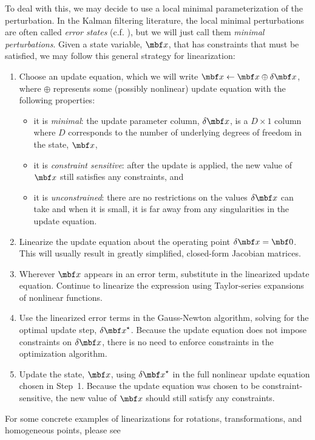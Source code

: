 \documentclass[11pt,a4,oneside]{article}
\begin{document}
To deal with this, we may decide to use a local minimal parameterization of the perturbation. In the Kalman filtering literature, the local minimal perturbations are often called {\em error states} (c.f. \citet{Mirzaei0800}), but we will just call them {\em minimal perturbations}. Given a state variable, $\mbf x$, that has constraints that must be satisfied, we may follow this general strategy for linearization:
\begin{enumerate}
  \item Choose an update equation, which we will write $\mbf x \leftarrow \mbf x \oplus \mbfDel x$, where $\oplus$ represents some (possibly nonlinear) update equation with the following properties:
    \begin{itemize}
      \item it is {\em minimal}: the update parameter column, $\mbfDel x$, is a $D\times 1$ column where $D$ corresponds to the number of underlying degrees of freedom in the state, $\mbf x$, 
      \item it is {\em constraint sensitive}: after the update is applied, the new value of $\mbf x$ still satisfies any constraints, and
      \item it is {\em unconstrained}: there are no restrictions on the values $\mbfDel x$ can take and when it is small, it is far away from any singularities in the update equation.
    \end{itemize}
  \item Linearize the update equation about the operating point $\mbfDel x = \mbf 0$. This will usually result in greatly simplified, closed-form Jacobian matrices.
  \item Wherever $\mbf x$ appears in an error term, substitute in the linearized update equation. Continue to linearize the expression using Taylor-series expansions of nonlinear functions.
  \item Use the linearized error terms in the Gauss-Newton algorithm, solving for the optimal update step, $\mbfDel x^\star$. Because the update equation does not impose constraints on $\mbfDel x$, there is no need to enforce constraints in the optimization algorithm.
  \item Update the state, $\mbf x$, using $\mbfDel x^\star$ in the full nonlinear update equation chosen in Step~1. Because the update equation was chosen to be constraint-sensitive, the new value of $\mbf x$ should still satisfy any constraints.
\end{enumerate}
For some concrete examples of linearizations for rotations, transformations, and homogeneous points, please see \citet[Chapter~3]{FurgaleThesis}
\end{document}
